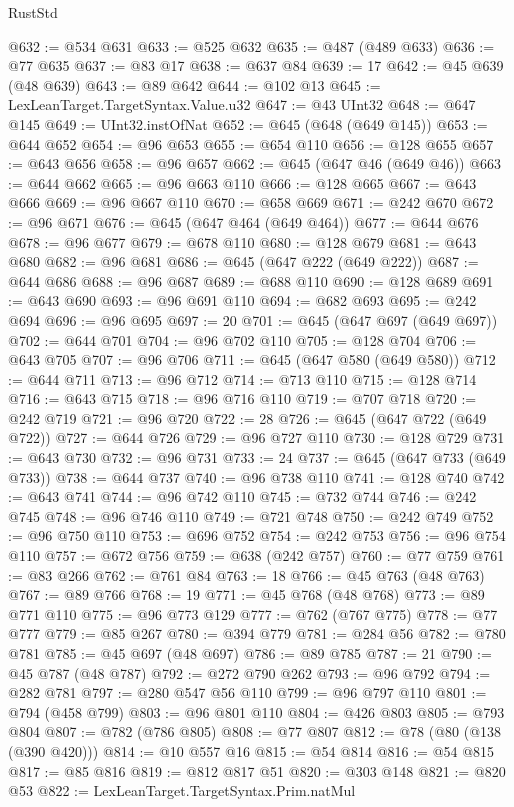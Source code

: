 \begin{lexlean}{RustStd}
\begin{coremodule}
@632 := @534 @631
@633 := @525 @632
@635 := @487 (@489 @633)
@636 := @77 @635
@637 := @83 @17
@638 := @637 @84
@639 := 17
@642 := @45 @639 (@48 @639)
@643 := @89 @642
@644 := @102 @13
@645 := LexLeanTarget.TargetSyntax.Value.u32
@647 := @43 UInt32
@648 := @647 @145
@649 := UInt32.instOfNat
@652 := @645 (@648 (@649 @145))
@653 := @644 @652
@654 := @96 @653
@655 := @654 @110
@656 := @128 @655
@657 := @643 @656
@658 := @96 @657
@662 := @645 (@647 @46 (@649 @46))
@663 := @644 @662
@665 := @96 @663 @110
@666 := @128 @665
@667 := @643 @666
@669 := @96 @667 @110
@670 := @658 @669
@671 := @242 @670
@672 := @96 @671
@676 := @645 (@647 @464 (@649 @464))
@677 := @644 @676
@678 := @96 @677
@679 := @678 @110
@680 := @128 @679
@681 := @643 @680
@682 := @96 @681
@686 := @645 (@647 @222 (@649 @222))
@687 := @644 @686
@688 := @96 @687
@689 := @688 @110
@690 := @128 @689
@691 := @643 @690
@693 := @96 @691 @110
@694 := @682 @693
@695 := @242 @694
@696 := @96 @695
@697 := 20
@701 := @645 (@647 @697 (@649 @697))
@702 := @644 @701
@704 := @96 @702 @110
@705 := @128 @704
@706 := @643 @705
@707 := @96 @706
@711 := @645 (@647 @580 (@649 @580))
@712 := @644 @711
@713 := @96 @712
@714 := @713 @110
@715 := @128 @714
@716 := @643 @715
@718 := @96 @716 @110
@719 := @707 @718
@720 := @242 @719
@721 := @96 @720
@722 := 28
@726 := @645 (@647 @722 (@649 @722))
@727 := @644 @726
@729 := @96 @727 @110
@730 := @128 @729
@731 := @643 @730
@732 := @96 @731
@733 := 24
@737 := @645 (@647 @733 (@649 @733))
@738 := @644 @737
@740 := @96 @738 @110
@741 := @128 @740
@742 := @643 @741
@744 := @96 @742 @110
@745 := @732 @744
@746 := @242 @745
@748 := @96 @746 @110
@749 := @721 @748
@750 := @242 @749
@752 := @96 @750 @110
@753 := @696 @752
@754 := @242 @753
@756 := @96 @754 @110
@757 := @672 @756
@759 := @638 (@242 @757)
@760 := @77 @759
@761 := @83 @266
@762 := @761 @84
@763 := 18
@766 := @45 @763 (@48 @763)
@767 := @89 @766
@768 := 19
@771 := @45 @768 (@48 @768)
@773 := @89 @771 @110
@775 := @96 @773 @129
@777 := @762 (@767 @775)
@778 := @77 @777
@779 := @85 @267
@780 := @394 @779
@781 := @284 @56
@782 := @780 @781
@785 := @45 @697 (@48 @697)
@786 := @89 @785
@787 := 21
@790 := @45 @787 (@48 @787)
@792 := @272 @790 @262
@793 := @96 @792
@794 := @282 @781
@797 := @280 @547 @56 @110
@799 := @96 @797 @110
@801 := @794 (@458 @799)
@803 := @96 @801 @110
@804 := @426 @803
@805 := @793 @804
@807 := @782 (@786 @805)
@808 := @77 @807
@812 := @78 (@80 (@138 (@390 @420)))
@814 := @10 @557 @16
@815 := @54 @814
@816 := @54 @815
@817 := @85 @816
@819 := @812 @817 @51
@820 := @303 @148
@821 := @820 @53
@822 := LexLeanTarget.TargetSyntax.Prim.natMul

\end{coremodule}
\end{lexlean}
